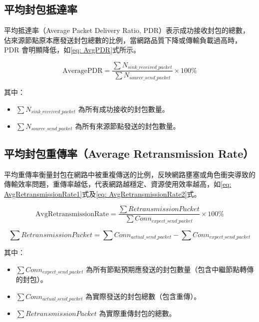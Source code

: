 \begin{ZhChapter}
\subsection{平均封包抵達率}

平均抵達率（Average Packet Delivery Ratio, PDR）表示成功接收封包的總數，佔來源節點原本應發送封包總數的比例，當網路品質下降或傳輸負載過高時，PDR 會明顯降低，如\ref{eq: AvgPDR}式所示。

\begin{equation}
\label{eq: AvgPDR}
\text{AveragePDR} = \frac{\sum N_{sink\_received\_packet}}{\sum N_{source\_send\_packet}} \times 100\%
\end{equation}

其中：
\begin{itemize}
    \item $\sum N_{sink\_received\_packet}$ 為所有成功接收的封包數量。
    \item $\sum N_{source\_send\_packet}$ 為所有來源節點發送的封包數量。
\end{itemize}

\subsection{平均封包重傳率（Average Retransmission Rate）}

平均重傳率衡量封包在網路中被重複傳送的比例，反映網路壅塞或角色衝突導致的傳輸效率問題，重傳率越低，代表網路越穩定、資源使用效率越高，如\ref{eq: AvgRetransmissionRate1}式及\ref{eq: AvgRetransmissionRate2}式。

\begin{equation}
\label{eq: AvgRetransmissionRate1}
\text{AvgRetransmissionRate} = \frac{\sum RetransmissionPacket}{\sum Conn_{expect\_send\_packet}} \times 100\%
\end{equation}

\begin{equation}
\label{eq: AvgRetransmissionRate2}
\sum RetransmissionPacket = \sum Conn_{actual\_send\_packet} - \sum Conn_{expect\_send\_packet}
\end{equation}

其中：
\begin{itemize}
    \item $\sum Conn_{expect\_send\_packet}$ 為所有節點預期應發送的封包數量（包含中繼節點轉傳的封包）。
    \item $\sum Conn_{actual\_send\_packet}$ 為實際發送的封包總數（包含重傳）。
    \item $\sum RetransmissionPacket$ 為實際重傳封包的總數。
\end{itemize}


\end{ZhChapter}

